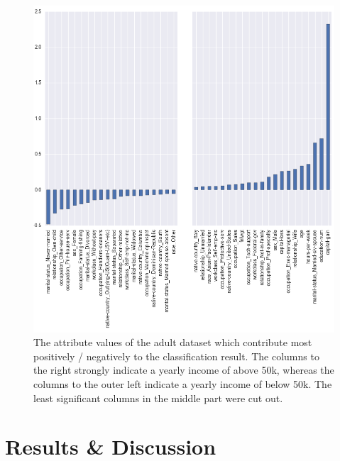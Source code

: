 \documentclass{llncs}
\begin{document}
\begin{figure}[!t]
	\begin{center}
		\vspace{-1.0cm}
    	\hspace*{-0.8cm}
		\includegraphics[width=1.1\textwidth]{figures/experiment/important_columns_cut}
		\caption{The attribute values of the adult dataset which contribute most positively / negatively to the classification result. The columns to the right strongly indicate a yearly income of above 50k, whereas the columns to the outer left indicate a yearly income of below 50k. The least significant columns in the middle part were cut out.}
		\label{fig:adult_important_columns}
	\end{center}
\end{figure}


\section{Results \& Discussion}
\label{sect:results}

\end{document}
